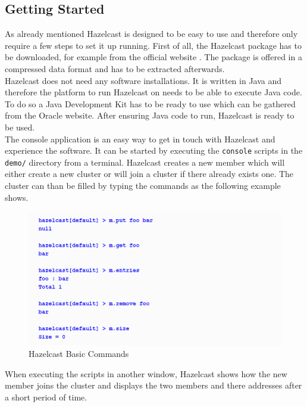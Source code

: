 \subsection*{Getting Started}
As already mentioned Hazelcast is designed to be easy to use and therefore only require a few steps to set it up running.
First of all, the Hazelcast package has to be downloaded, for example from the official website \cite{hazelcast:hazelcastDownload}. The package is offered in a compressed data format and has to be extracted afterwards.\\
Hazelcast does not need any software installations. It is written in Java and therefore the platform to run Hazelcast on needs to be able to execute Java code. To do so a Java Development Kit has to be ready to use which can be gathered from the Oracle website. After ensuring Java code to run, Hazelcast is ready to be used.\\
The console application is an easy way to get in touch with Hazelcast and experience the software. It can be started by executing the \texttt{console} scripts in the \texttt{demo/} directory from a terminal. Hazelcast creates a new member which will either create a new cluster or will join a cluster if there already exists one. The cluster can than be filled by typing the commands as the following example shows.
\begin{flushleft}
\begin{figure}[ht]
    \includegraphics{content/images/hazelcastPut.PNG} 
    \caption{Hazelcast Basic Commands \cite{johns2015}}
\end{figure}
\end{flushleft}
When executing the scripts in another window, Hazelcast shows how the new member joins the cluster and displays the two members and there addresses after a short period of time.


